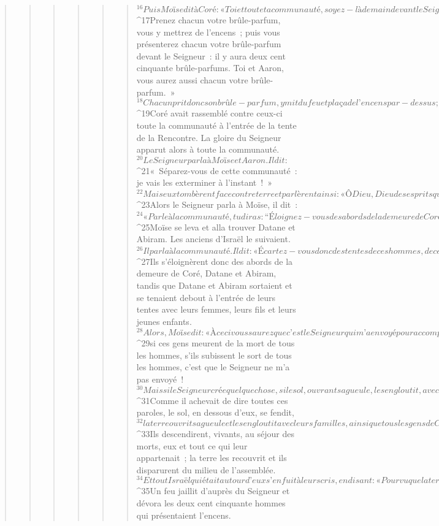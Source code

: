 \begin{verse}
\begin{verse}
\begin{verse}
\begin{verse}
\begin{verse}
\begin{verse}
${}^{16}Puis Moïse dit à Coré : « Toi et toute ta communauté, soyez-là demain devant le Seigneur, toi, eux tous et Aaron ! 
${}^{17}Prenez chacun votre brûle-parfum, vous y mettrez de l’encens ; puis vous présenterez chacun votre brûle-parfum devant le Seigneur : il y aura deux cent cinquante brûle-parfums. Toi et Aaron, vous aurez aussi chacun votre brûle-parfum. » 
${}^{18}Chacun prit donc son brûle-parfum, y mit du feu et plaça de l’encens par-dessus ; ils se tinrent à l’entrée de la tente de la Rencontre, ainsi que Moïse et Aaron. 
${}^{19}Coré avait rassemblé contre ceux-ci toute la communauté à l’entrée de la tente de la Rencontre. La gloire du Seigneur apparut alors à toute la communauté. 
${}^{20}Le Seigneur parla à Moïse et Aaron. Il dit : 
${}^{21}« Séparez-vous de cette communauté : je vais les exterminer à l’instant ! » 
${}^{22}Mais eux tombèrent face contre terre et parlèrent ainsi : « Ô Dieu, Dieu des esprits qui animent toute chair, un seul homme est en faute, et c’est contre toute la communauté que tu t’irriterais ! »
${}^{23}Alors le Seigneur parla à Moïse, il dit : 
${}^{24}« Parle à la communauté, tu diras : “Éloignez-vous des abords de la demeure de Coré, Datane et Abiram !” » 
${}^{25}Moïse se leva et alla trouver Datane et Abiram. Les anciens d’Israël le suivaient. 
${}^{26}Il parla à la communauté. Il dit : « Écartez-vous donc des tentes de ces hommes, de ces coupables ! Ne touchez à rien de ce qui leur appartient, de peur que vous ne périssiez pour toutes leurs fautes ! » 
${}^{27}Ils s’éloignèrent donc des abords de la demeure de Coré, Datane et Abiram, tandis que Datane et Abiram sortaient et se tenaient debout à l’entrée de leurs tentes avec leurs femmes, leurs fils et leurs jeunes enfants. 
${}^{28}Alors, Moïse dit : « À ceci vous saurez que c’est le Seigneur qui m’a envoyé pour accomplir toutes ces œuvres, je ne les accomplis pas de moi-même : 
${}^{29}si ces gens meurent de la mort de tous les hommes, s’ils subissent le sort de tous les hommes, c’est que le Seigneur ne m’a pas envoyé ! 
${}^{30}Mais si le Seigneur crée quelque chose, si le sol, ouvrant sa gueule, les engloutit, avec tout ce qui leur appartient, s’ils descendent vivants au séjour des morts, alors vous saurez que ces hommes ont méprisé le Seigneur. »
${}^{31}Comme il achevait de dire toutes ces paroles, le sol, en dessous d’eux, se fendit, 
${}^{32}la terre ouvrit sa gueule et les engloutit avec leurs familles, ainsi que tous les gens de Coré et tous leurs biens. 
${}^{33}Ils descendirent, vivants, au séjour des morts, eux et tout ce qui leur appartenait ; la terre les recouvrit et ils disparurent du milieu de l’assemblée. 
${}^{34}Et tout Israël qui était autour d’eux s’enfuit à leurs cris, en disant : « Pourvu que la terre ne nous engloutisse pas ! »
${}^{35}Un feu jaillit d’auprès du Seigneur et dévora les deux cent cinquante hommes qui présentaient l’encens.
      

\end{verse}
\end{verse}
\end{verse}
\end{verse}
\end{verse}
\end{verse}
